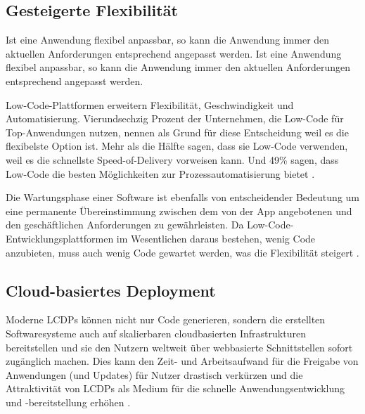 \documentclass[12pt]{article} %
\begin{document}
	\subsection{Gesteigerte Flexibilität}
	Ist eine Anwendung flexibel anpassbar, so kann die Anwendung immer den aktuellen Anforderungen entsprechend angepasst werden. Ist eine Anwendung flexibel anpassbar, so kann die Anwendung immer den aktuellen Anforderungen entsprechend angepasst werden. 
	
	Low-Code-Plattformen erweitern Flexibilität, Geschwindigkeit und Automatisierung. Vierundsechzig Prozent der Unternehmen, die Low-Code für Top-Anwendungen nutzen, nennen als Grund für diese Entscheidung weil es die flexibelste Option ist. 
	Mehr als die Hälfte sagen, dass sie Low-Code verwenden, weil es die schnellste Speed-of-Delivery vorweisen kann. Und 49\% sagen, dass Low-Code die besten Möglichkeiten zur Prozessautomatisierung bietet \cite{EmmaVanPelt.2019}. \newline
	
	Die Wartungsphase einer Software ist ebenfalls von entscheidender Bedeutung um eine permanente Übereinstimmung zwischen dem von der App angebotenen und den geschäftlichen Anforderungen zu gewährleisten. Da Low-Code-Entwicklungsplattformen im Wesentlichen daraus bestehen, wenig Code anzubieten, muss auch wenig Code gewartet werden, was die Flexibilität steigert \cite{Sanchis.2020b}.
	
	\subsection{Cloud-basiertes Deployment}
	Moderne LCDPs können nicht nur Code generieren, sondern die erstellten Softwaresysteme auch auf skalierbaren cloudbasierten Infrastrukturen bereitstellen und sie den Nutzern weltweit über webbasierte Schnittstellen sofort zugänglich machen. Dies kann den Zeit- und Arbeitsaufwand für die Freigabe von Anwendungen (und Updates) für Nutzer drastisch verkürzen und die Attraktivität von LCDPs als Medium für die schnelle Anwendungsentwicklung und -bereitstellung erhöhen \cite{DiRuscio.2022}.
	


	
\end{document}
